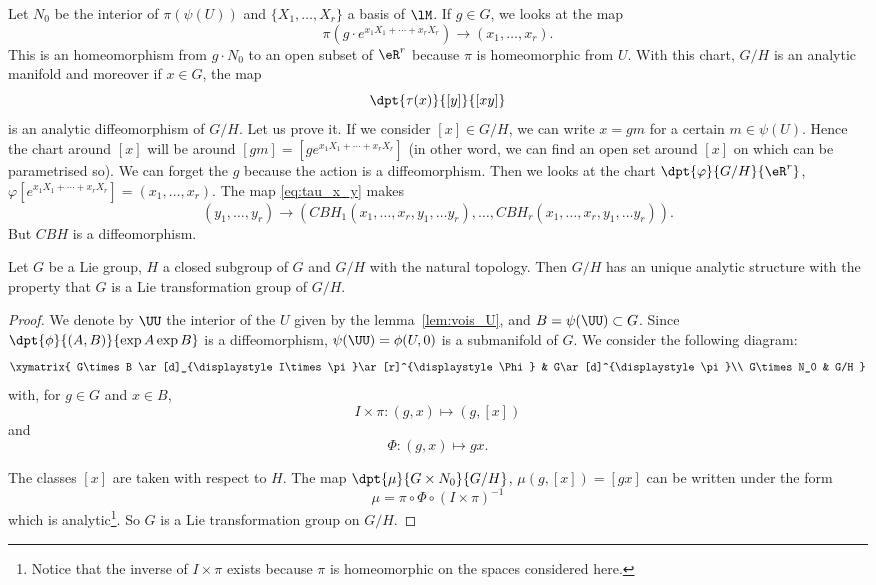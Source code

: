 Let $N_0$ be the interior of $\pi(\psi(U))$ and $\{X_1,\ldots, X_r\}$ a basis of $\lM$. If $g\in G$, we looks at the map
\[
  \pi(g\cdot e^{x_1X_1+\cdots+x_rX_r})\to(x_1,\ldots,x_r).
\]
This is an homeomorphism from $g\cdot N_0$ to an open subset of $\eR^r$ because $\pi$ is homeomorphic from $U$. With this chart, $G/H$ is an analytic manifold  and moreover if $x\in G$, the map
\begin{equation}\label{eq:tau_x_y}
  \dpt{\tau(x)}{[y]}{[xy]}
\end{equation}
is an analytic diffeomorphism of $G/H$. Let us prove it. If we consider $[x]\in G/H$, we can write $x=gm$ for a certain $m\in\psi(U)$. Hence the chart around $[x]$ will be around $[gm]=[ge^{x_1X_1+\cdots+x_rX_r}]$ (in other word, we can find an open set around $[x]$ on which can be parametrised so). We can forget the $g$ because the action is a diffeomorphism. Then we looks at the chart $\dpt{\varphi}{G/H}{\eR^r}$, $\varphi[e^{x_1X_1+\cdots+x_rX_r}]=(x_1,\ldots,x_r)$. The map \eqref{eq:tau_x_y} makes 
\begin{equation}
    (y_1,\ldots,y_r)\to( CBH_1(x_1,\ldots,x_r,y_1,\ldots y_r),\ldots, CBH_r(x_1,\ldots,x_r,y_1,\ldots y_r)).
\end{equation}
But $CBH$ is a diffeomorphism.

\begin{theorem}\label{Helgason4.2}\label{tho:struc_anal}
Let $G$ be a Lie group, $H$ a closed subgroup of $G$ and $G/H$ with the natural topology. Then $G/H$ has an unique analytic structure with the property that $G$ is a Lie transformation group of $G/H$.
\end{theorem}

\begin{proof}
We denote by $\UU$ the interior of the $U$ given by the lemma~\ref{lem:vois_U}, and $B=\psi(\UU)\subset G$. Since $\dpt{\phi}{(A,B)}{\exp A\exp B}$ is a diffeomorphism, $\psi(\UU)=\phi(U,0)$ is a submanifold of $G$. We consider the following diagram:
\[
\xymatrix{
    G\times B  \ar[d]_{\displaystyle I\times\pi}\ar[r]^{\displaystyle\Phi}    &
                                                                     G\ar[d]^{\displaystyle\pi}\\
    G\times N_0 &                                                             G/H
  }\]
with, for $g\in G$ and $x\in B$,
\[
I\times\pi\colon (g,x)\mapsto (g,[x])
\]
and
\[
\Phi\colon (g,x)\mapsto gx.
\]

\noindent The classes $[x]$ are taken with respect to $H$. The map $\dpt{\mu}{G\times N_0}{G/H}$, $\mu(g,[x])=[gx]$ can be written under the form
\[
   \mu=\pi\circ\Phi\circ(I\times\pi)^{-1}
\]
which is analytic\footnote{Notice that the inverse of $I\times\pi$ exists because $\pi$ is homeomorphic on the spaces considered here.}. So $G$ is a Lie transformation group on $G/H$.

\end{proof}


